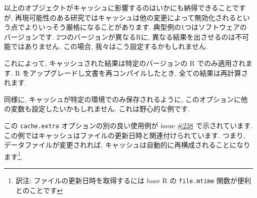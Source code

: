 \documentclass[
  xelatex,ja=standard,jafont=noto]{bxjsreport}
\newenvironment{Shaded}{\begin{snugshade}}{\end{snugshade}}
\newcommand{\AttributeTok}[1]{\textcolor[rgb]{0.77,0.63,0.00}{#1}}
\newcommand{\CommentTok}[1]{\textcolor[rgb]{0.56,0.35,0.01}{\textit{#1}}}
\newcommand{\DocumentationTok}[1]{\textcolor[rgb]{0.56,0.35,0.01}{\textbf{\textit{#1}}}}
\newcommand{\FunctionTok}[1]{\textcolor[rgb]{0.00,0.00,0.00}{#1}}
\newcommand{\NormalTok}[1]{#1}
\newcommand{\SpecialCharTok}[1]{\textcolor[rgb]{0.00,0.00,0.00}{#1}}
\newcommand{\StringTok}[1]{\textcolor[rgb]{0.31,0.60,0.02}{#1}}
\begin{document}
以上のオブジェクトがキャッシュに影響するのはいかにも納得できることですが,
再現可能性のある研究ではキャッシュは他の変更によって無効化されるという点でよりいっそう厳格になることがあります.
典型例の1つはソフトウェアのバージョンです. 2つのバージョンが異なるRに,
異なる結果を出させるのは不可能ではありません. この場合,
我々はこう設定するかもしれません.

\begin{Shaded}
\end{Shaded}

これによって, キャッシュされた結果は特定のバージョンの R
でのみ適用されます. R をアップグレードし文書を再コンパイルしたとき,
全ての結果は再計算されます.

同様に, キャッシュが特定の環境でのみ保存されるように,
このオプションに他の変数も設定したいかもしれません.
これは野心的な例です.

\begin{Shaded}
\end{Shaded}

この \texttt{cache.extra} オプションの別の良い使用例が issue
\href{https://github.com/yihui/knitr/issues/238}{\#238}
で示されています.
この例ではキャッシュはファイルの更新日時と関連付けられています. つまり,
データファイルが変更されれば,
キャッシュは自動的に再構成されることになります\footnote{訳注:
  ファイルの更新日時を取得するには base R の \texttt{file.mtime}
  関数が便利とのことです}.
\end{document}
